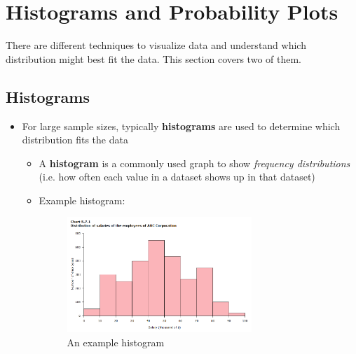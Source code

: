 \documentclass[12pt]{article}
\begin{document}
\section*{Histograms and Probability Plots}

There are different techniques to visualize data and understand which distribution might best fit the data. This section covers two of them.

\subsection*{Histograms}
\begin{itemize}
	\item For large sample sizes, typically \textbf{histograms} are used to
	      determine which distribution fits the data
	      \begin{itemize}
              \item A \textbf{histogram} is a commonly used graph to show
                  \emph{frequency distributions} (i.e. how often each value in
                  a dataset shows up in that dataset)
		      \item Example histogram:
		            \begin{figure}[H]
			            \begin{center}
				            \includegraphics[width=0.7\textwidth]{1}
			            \end{center}
			            \caption{An example histogram}\label{fig:1}
		            \end{figure}
	      \end{itemize}
\end{itemize}
\end{document}
